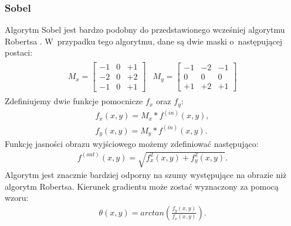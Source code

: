 \subsubsection{Sobel} \label{sssec:sobel}
Algorytm Sobel jest bardzo podobny do przedstawionego wcześniej algorytmu Robertsa \cite{nixon08}. W~przypadku tego algorytmu, dane są dwie maski o~następującej postaci:
\begin{gather*}
\begin{matrix}
  M_x = \begin{bmatrix}
    -1 & 0 & +1 \\
    -2 & 0 & +2 \\
    -1 & 0 & +1
  \end{bmatrix}
&
  M_y = \begin{bmatrix}
    -1 & -2 & -1 \\
    0 & 0 & 0 \\
    +1 & +2 & +1
  \end{bmatrix}
\end{matrix}
\end{gather*}
Zdefiniujemy dwie funkcje pomocnicze $f_x$ oraz $f_y$:
\begin{gather*}
  f_x(x, y)  = M_x * f^{(in)}(x, y), \\
  f_y(x, y)  = M_y * f^{(in)}(x, y).
\end{gather*}
Funkcję jasności obrazu wyjściowego możemy zdefiniować następująco:
\begin{gather*}
  f^{(out)}(x, y) = \sqrt{f_x^2(x, y)+f_{y}^2(x, y)}.
\end{gather*}
Algorytm jest znacznie bardziej odporny na szumy występujące na obrazie niż algorytm Robertsa. Kierunek gradientu może zostać wyznaczony za pomocą wzoru:
\begin{gather*}
  \theta(x, y) = arctan(\frac{f_y(x, y)}{f_x(x, y)}).
\end{gather*}

